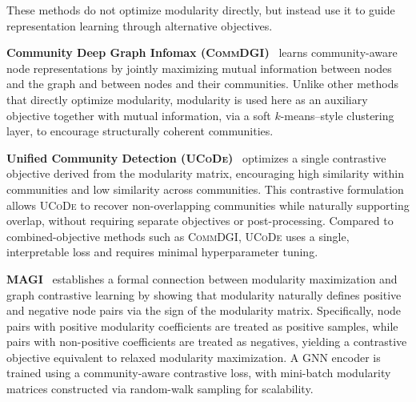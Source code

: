 \documentclass[../paper.tex]{subfiles}
\begin{document}
These methods do not optimize modularity directly, but instead use it to guide representation learning through alternative objectives.

\textbf{Community Deep Graph Infomax (\textsc{CommDGI})}~\cite{commdgi2020} learns community-aware node representations by jointly maximizing mutual information between nodes and the graph and between nodes and their communities.
Unlike other methods that directly optimize modularity, modularity is used here as an auxiliary objective together with mutual information, via a soft $k$-means–style clustering layer, to encourage structurally coherent communities.

\textbf{Unified Community Detection (\textsc{UCoDe})}~\cite{ucode2023} optimizes a single contrastive objective derived from the modularity matrix, encouraging high similarity within communities and low similarity across communities.
This contrastive formulation allows \textsc{UCoDe} to recover non-overlapping communities while naturally supporting overlap, without requiring separate objectives or post-processing.
Compared to combined-objective methods such as \textsc{CommDGI}, \textsc{UCoDe} uses a single, interpretable loss and requires minimal hyperparameter tuning.

\textbf{\textsc{MAGI}}~\cite{magi2024} establishes a formal connection between modularity maximization and graph contrastive learning by showing that modularity naturally defines positive and negative node pairs via the sign of the modularity matrix.
Specifically, node pairs with positive modularity coefficients are treated as positive samples, while pairs with non-positive coefficients are treated as negatives, yielding a contrastive objective equivalent to relaxed modularity maximization.
A GNN encoder is trained using a community-aware contrastive loss, with mini-batch modularity matrices constructed via random-walk sampling for scalability.



\ifSubfilesClassLoaded{%
}{}
\end{document}
